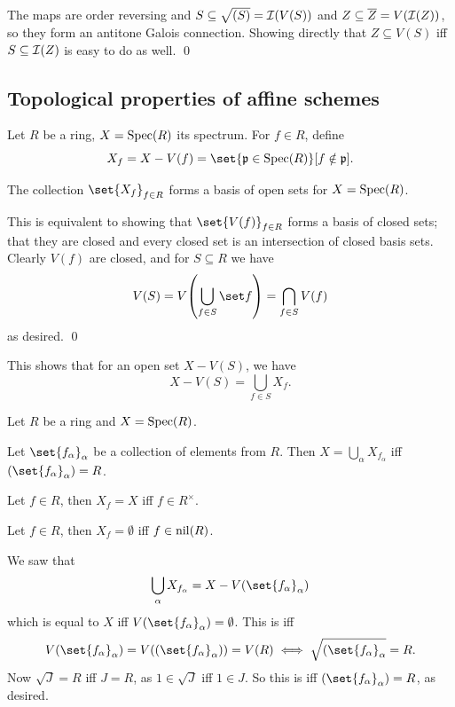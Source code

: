 \ecoro

\bproof

    The maps are order reversing and $S\subseteq\sqrt{(S)}={\cal I}(V(S))$ and $Z\subseteq{\overline{Z}}=V({\cal I}(Z))$, so they form an antitone Galois connection.
    Showing directly that $Z\subseteq V(S)$ iff $S\subseteq{\cal I}(Z)$ is easy to do as well.
    \qed

\eproof

\subsection{Topological properties of affine schemes}

\bdefn

    Let $R$ be a ring, $X={\rm Spec}(R)$ its spectrum.
    For $f\in R$, define
    $$ X_f = X - V(f) = \set{\p\in\spec(R)}[f\notin\p] . $$

\edefn

\bprop

    The collection $\set{X_f}_{f\in R}$ forms a basis of open sets for $X={\rm Spec}(R)$.

\eprop

\bproof

    This is equivalent to showing that $\set{V(f)}_{f\in R}$ forms a basis of closed sets; that they are closed and every closed set is an intersection of closed basis sets.
    Clearly $V(f)$ are closed, and for $S\subseteq R$ we have
    $$ V(S) = V\parens{\bigcup_{f\in S}\set f} = \bigcap_{f\in S}V(f) $$
    as desired.
    \qed

\eproof

This shows that for an open set $X-V(S)$, we have
$$ X - V(S) = \bigcup_{f\in S}X_f . $$

\bprop

    Let $R$ be a ring and $X={\rm Spec}(R)$.
    \benum
        \item Let $\set{f_\alpha}_\alpha$ be a collection of elements from $R$.
        Then $X=\bigcup_\alpha X_{f_\alpha}$ iff $(\set{f_\alpha}_\alpha)=R$.
        \item Let $f\in R$, then $X_f=X$ iff $f\in R^\times$.
        \item Let $f\in R$, then $X_f=\emptyset$ iff $f\in{\rm nil}(R)$.
    \eenum

\eprop

\bproof

    We saw that
    $$ \bigcup_\alpha X_{f_\alpha} = X - V(\set{f_\alpha}_\alpha) $$
    which is equal to $X$ iff $V(\set{f_\alpha}_\alpha)=\emptyset$.
    This is iff
    $$ V(\set{f_\alpha}_\alpha) = V((\set{f_\alpha}_\alpha)) = V(R) \iff \sqrt{(\set{f_\alpha}_\alpha} = R . $$
    Now $\sqrt J=R$ iff $J=R$, as $1\in\sqrt J$ iff $1\in J$.
    So this is iff $(\set{f_\alpha}_\alpha)=R$, as desired.

